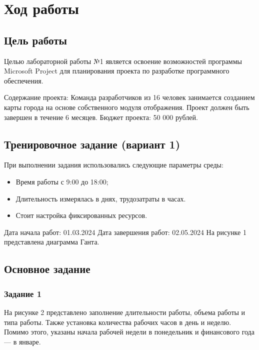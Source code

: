 
\chapter{Ход работы}

\section{Цель работы}
Целью лабораторной работы №1 является освоение возможностей программы Microsoft Project для планирования проекта по разработке программного обеспечения.

Содержание проекта: Команда разработчиков из 16 человек занимается созданием карты города на основе собственного модуля отображения. Проект должен быть завершен в течение 6 месяцев. Бюджет проекта: 50 000 рублей.

\section{Тренировочное задание (вариант 1)}
При выполнении задания использовались следующие параметры среды:
\begin{itemize}
\item	Время работы с 9:00 до 18:00;
\item	Длительность измерялась в днях, трудозатраты в часах.
\item	Стоит настройка фиксированных ресурсов.
\end{itemize}
Дата начала работ: 01.03.2024
Дата завершения работ: 02.05.2024
На рисунке 1 представлена диаграмма Ганта.


\section{Основное задание}
\subsection{Задание 1}
На рисунке 2 представлено заполнение длительности работы, объема работы и типа работы. Также установка количества рабочих часов в день и неделю. Помимо этого, указаны начала рабочей недели в понедельник и финансового года — в январе.

